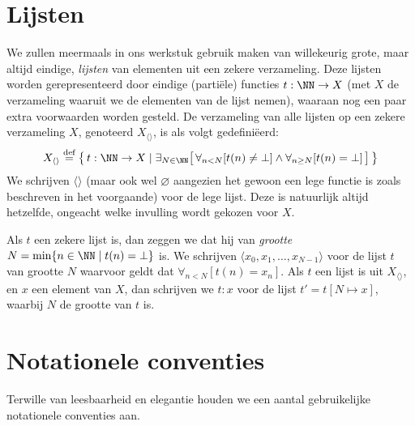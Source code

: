 \section{Lijsten}

We zullen meermaals in ons werkstuk gebruik maken van willekeurig grote, maar altijd eindige, \emph{lijsten} van elementen uit een zekere verzameling. Deze lijsten worden gerepresenteerd door eindige (partiële) functies $t : \NN \to X$ (met $X$ de verzameling waaruit we de elementen van de lijst nemen), waaraan nog een paar extra voorwaarden worden gesteld. De verzameling van alle lijsten op een zekere verzameling $X$, genoteerd $X_{\langle\rangle}$, is als volgt gedefiniëerd:
\begin{equation*}
X_{\langle\rangle} \DEF \big\{\, t : \NN \to X \mid \exists_{N \in \NN} \surr{ \forall_{n < N}[t(n) \neq \bot] \land \forall_{n\ge N}[t(n) = \bot] } \,\big\}
\end{equation*}
We schrijven $\langle\rangle$ (maar ook wel $\varnothing$ aangezien het gewoon een lege functie is zoals beschreven in het voorgaande) voor de lege lijst. Deze is natuurlijk altijd hetzelfde, ongeacht welke invulling wordt gekozen voor $X$.

Als $t$ een zekere lijst is, dan zeggen we dat hij van \emph{grootte} $N = \min\{n\in\NN \mid t(n) = \bot\}$ is.
We schrijven $\langle x_0, x_1, \dots, x_{N-1}\rangle$ voor de lijst $t$ van grootte $N$ waarvoor geldt dat $\forall_{n < N}[t(n) = x_n]$.
Als $t$ een lijst is uit $X_{\langle\rangle}$, en $x$ een element van $X$, dan schrijven we $t:x$ voor de lijst $t' = t[N \mapsto x]$, waarbij $N$ de grootte van $t$ is.%


\section{Notationele conventies}

Terwille van leesbaarheid en elegantie houden we een aantal gebruikelijke notationele conventies aan.

